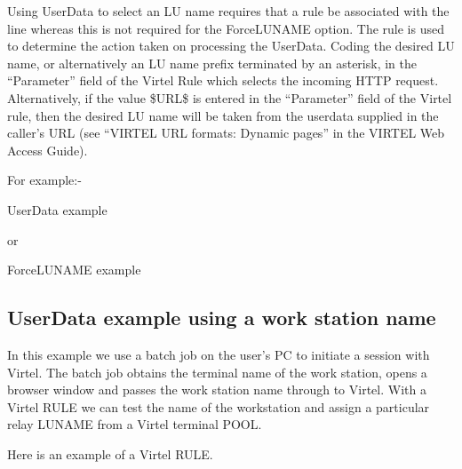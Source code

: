 \documentclass[letterpaper,10pt,english]{sphinxmanual}
\begin{document}
Using UserData to select an LU name requires that a rule be associated with the line whereas this is not required for the ForceLUNAME option. The rule is used to determine the action taken on processing the UserData. Coding the desired LU name, or alternatively an LU name prefix terminated by an asterisk, in the “Parameter” field of the Virtel Rule which selects the incoming HTTP request. Alternatively, if the value \$URL\$ is entered in the “Parameter” field of the Virtel rule, then the desired LU name will be taken from the userdata supplied in the caller’s URL (see “VIRTEL URL formats: Dynamic pages” in the VIRTEL Web Access Guide).

For example:-

            UserData example

or

          ForceLUNAME example


\subsection{UserData example using a work station name}
\label{\detokenize{connectivity_guide:index-150}}\label{\detokenize{connectivity_guide:userdata-example-using-a-work-station-name}}
In this example we use a batch job on the user’s PC to initiate a session with Virtel. The batch job obtains the terminal name of the work station, opens a browser window and passes the work station name through to Virtel. With a Virtel RULE we can test the name of the workstation and assign a particular relay LUNAME from a Virtel terminal POOL.

Here is an example of a Virtel RULE.

\begin{sphinxVerbatim}[commandchars=\\\{\}]
 
\end{sphinxVerbatim}
\end{document}
